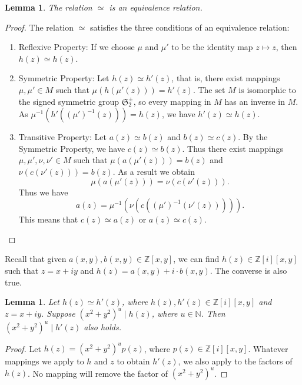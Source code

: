\documentclass[12pt,table]{article}
\newtheorem{lemma}[theorem]{Lemma}
\theoremstyle{definition}
\theoremstyle{remark}
\newcommand{\Nnn}{\mathbb N}
\newcommand{\Zzz}{\mathbb Z}
\newcommand{\divides}{\mid}
\numberwithin{equation}{section}
\begin{document}
\begin{lemma}
The relation $ \simeq $ is an equivalence relation.
\end{lemma}

\begin{proof}
The relation $ \simeq $ satisfies the three conditions of an equivalence relation:
\begin{enumerate}
\item Reflexive Property: If we choose $ \mu $ and $ \mu'$ to be the identity map $ z \mapsto z $, 
then $ h(z) \simeq h(z) $.

\item Symmetric Property: Let  $ h(z) \simeq h'(z) $, that is, there exist mappings 
$ \mu, \mu' \in M $
such that $ \mu( h( \mu'( z ) ) )  = h'(z) $.
The set $M$ is isomorphic to the signed symmetric group $ \mathfrak{S}_2^\pm $,
so every mapping in $M$
has an inverse in $M$. As  $ \mu^{-1}( h'( (\mu')^{-1}( z ) ) )  = h(z) $,
we have $ h'(z) \simeq h(z) $.

\item Transitive Property: Let $ a(z) \simeq b(z) $ and $ b(z) \simeq c(z) $. By the 
Symmetric Property, we have $ c(z) \simeq b(z) $. Thus there exist mappings
$ \mu, \mu', \nu, \nu' \in M $ such that $ \mu( a( \mu'( z ) ) )  = b(z) $ and 
$ \nu( c( \nu'( z ) ) )  = b(z) $. As a result we obtain
\[
\mu( a( \mu'( z ) ) ) = \nu( c( \nu'( z ) ) ). 
\]
Thus we have
\[
a(  z  ) = \mu^{-1}( \nu( c( (\mu')^{-1}( \nu'( z ) ) ) ) ).
\]
This means that $ c(z) \simeq a(z) $ or $ a(z) \simeq c(z) $. \qedhere
\end{enumerate}
\end{proof}

Recall that given $ a(x,y), b(x,y) \in \Zzz[x,y] $,
we can find $ h(z) \in \Zzz [i][x,y] $
such that
$ z = x + iy $
and
$ h(z) = a(x,y) + i \cdot b(x,y) $. 
The converse is also true.



\begin{lemma}
Let $ h(z) \simeq h'(z) $, where $ h(z), h'(z) \in \Zzz[i][x,y] $
and $ z = x+ iy $.
Suppose $ ( x^2 + y^2 ) ^ u \divides h(z) $,
where $ u \in \Nnn $. Then $ ( x^2 + y^2 ) ^ u \divides h'(z) $ also holds.
\end{lemma}
   
\begin{proof}
Let $ h(z) = ( x^2 + y^2 ) ^ u  p(z) $, where $ p(z) \in \Zzz [i][x,y] $. 
Whatever mappings we apply to $h$ and $z$
to obtain $ h'(z) $, we also apply to the factors of $ h(z) $. 
No mapping will remove the factor of $ ( x^2 + y^2 ) ^ u $.
\end{proof}
\end{document}
